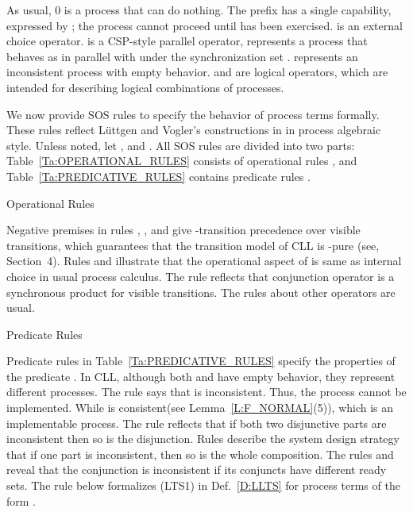 \documentclass{elsarticle}
\theoremstyle{plain}
\theoremstyle{definition}
\begin{document}
As usual, 0 is a process that can do nothing.
The prefix  has a single capability, expressed by ; the process  cannot proceed until  has been exercised.
 is an external choice operator.
 is a CSP-style parallel operator,  represents a process that behaves as  in parallel with  under the synchronization set .
 represents an inconsistent process with empty behavior.
 and  are logical operators, which are intended for describing logical combinations of processes.

We now provide SOS rules to specify the behavior of process terms formally.
These rules reflect L\"{u}ttgen and Vogler's constructions in \cite{Luttgen10} in process algebraic style.
Unless noted, let ,  and .
All SOS rules are divided into two parts: Table~\ref{Ta:OPERATIONAL_RULES} consists of operational rules , and Table~\ref{Ta:PREDICATIVE_RULES} contains predicate rules .

\begin{table}[ht]
\begin{center}
\fbox{}
\caption{Operational Rules\label{Ta:OPERATIONAL_RULES}}
\end{center}
\end{table}

Negative premises in rules , ,  and  give -transition precedence over visible transitions, which guarantees that the transition model of CLL is -pure (see, Section~4).
Rules  and  illustrate that the operational aspect of  is same as internal choice in usual process calculus.
The rule  reflects that conjunction operator is a synchronous product for visible transitions.
The rules about other operators are usual.

\begin{table}[ht]
\begin{center}
\fbox{}
\caption{Predicate Rules}\label{Ta:PREDICATIVE_RULES}
\end{center}
\end{table}

Predicate rules in Table~\ref{Ta:PREDICATIVE_RULES} specify the properties of the predicate .
In CLL, although both  and  have empty behavior, they represent different processes.
The rule  says that  is inconsistent.
Thus, the process  cannot be implemented.
While  is consistent(see Lemma~\ref{L:F_NORMAL}(5)), which is an implementable process.
The rule  reflects that if both two disjunctive parts are inconsistent then so is the disjunction.
Rules  describe the system design strategy that if one part is inconsistent, then so is the whole composition.
The rules  and  reveal that the conjunction is inconsistent if its conjuncts have different ready sets.
The rule below formalizes (LTS1) in Def.~\ref{D:LLTS} for process terms of the form .
\end{document}
